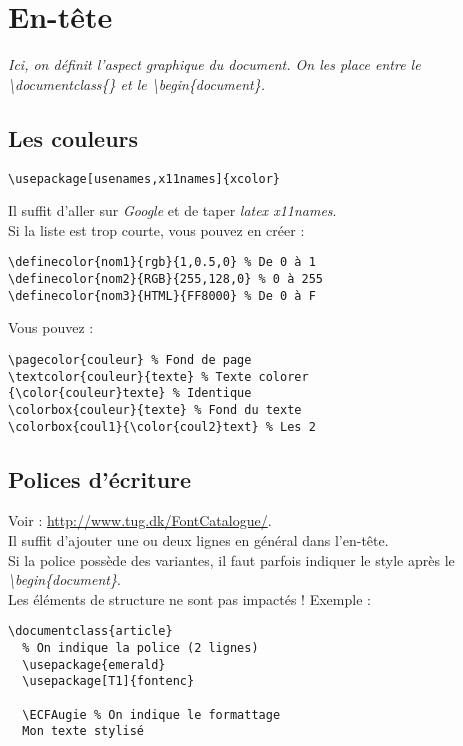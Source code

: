     \section{En-tête}
        \emph{Ici, on définit l'aspect graphique du document. On les place entre le \textbackslash documentclass\{\} et le \textbackslash begin\{document\}.}
        \subsection{Les couleurs}
            \begin{lstlisting}
\usepackage[usenames,x11names]{xcolor}
            \end{lstlisting}
            Il suffit d'aller sur \textit{Google} et de taper \textit{latex x11names}.\\
            Si la liste est trop courte, vous pouvez en créer :
            \begin{lstlisting}
\definecolor{nom1}{rgb}{1,0.5,0} % De 0 à 1
\definecolor{nom2}{RGB}{255,128,0} % 0 à 255
\definecolor{nom3}{HTML}{FF8000} % De 0 à F
            \end{lstlisting}
            Vous pouvez :
            \begin{lstlisting}
\pagecolor{couleur} % Fond de page
\textcolor{couleur}{texte} % Texte colorer
{\color{couleur}texte} % Identique
\colorbox{couleur}{texte} % Fond du texte
\colorbox{coul1}{\color{coul2}text} % Les 2
            \end{lstlisting}
        \subsection{Polices d'écriture}
            Voir : \url{http://www.tug.dk/FontCatalogue/}.\\Il suffit d'ajouter une ou deux lignes en général dans l'en-tête.\\
            Si la police possède des variantes, il faut parfois indiquer le style après le \textit{\textbackslash begin\{document\}}.\\
            Les éléments de structure ne sont pas impactés ! Exemple :
            \begin{lstlisting}
\documentclass{article}
  % On indique la police (2 lignes)
  \usepackage{emerald}
  \usepackage[T1]{fontenc}

  \ECFAugie % On indique le formattage
  Mon texte stylisé

            \end{lstlisting}
